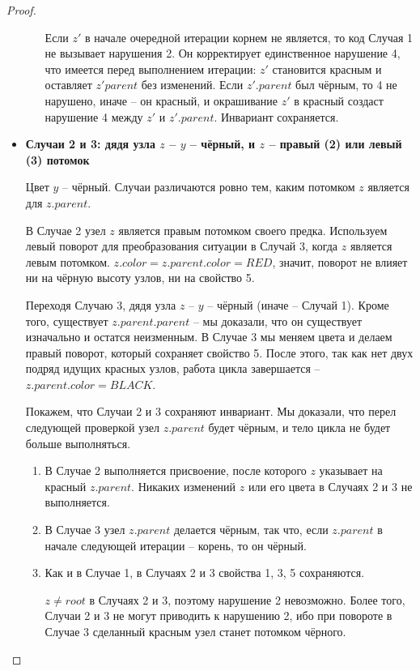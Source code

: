 \documentclass[a4paper,12pt]{article}
\begin{document}
\begin{proof}
\begin{itemize}
\begin{enumerate}
            Если $z'$ в начале очередной итерации корнем не является, то код Случая 1 не вызывает нарушения 2. Он корректирует единственное нарушение 4, что имеется перед выполнением итерации: $z'$ становится красным и оставляет $z'parent$ без изменений. Если $z'.parent$ был чёрным, то 4 не нарушено, иначе -- он красный, и окрашивание $z'$ в красный создаст нарушение 4 между $z'$ и $z'.parent$. Инвариант сохраняется.
        \end{enumerate}
        
        \item \textbf{Случаи 2 и 3: дядя узла $z$ -- $y$ -- чёрный, и $z$ -- правый (2) или левый (3) потомок}
        
        Цвет $y$ -- чёрный. Случаи различаются ровно тем, каким потомком $z$ является для $z.parent$.
        
        В Случае 2 узел $z$ является правым потомком своего предка. Используем левый поворот для преобразования ситуации в Случай 3, когда $z$ является левым потомком. $z.color = z.parent.color = RED$, значит, поворот не влияет ни на чёрную высоту узлов, ни на свойство 5. 
        
        Переходя Случаю 3, дядя узла $z$ -- $y$ -- чёрный (иначе -- Случай 1). Кроме того, существует $z.parent.parent$ -- мы доказали, что он существует изначально и остатся неизменным. В Случае 3 мы меняем цвета и делаем правый поворот, который сохраняет свойство 5. После этого, так как нет двух подряд идущих красных узлов, работа цикла завершается -- $z.parent.color = BLACK$.
        
        Покажем, что Случаи 2 и 3 сохраняют инвариант. Мы доказали, что перел следующей проверкой узел $z.parent$ будет чёрным, и тело цикла не будет больше выполняться.
        \begin{enumerate}
            \item В Случае 2 выполняется присвоение, после которого $z$ указывает на красный $z.parent$. Никаких изменений $z$ или его цвета в Случаях 2 и 3 не выполняется.
            
            \item В Случае 3 узел $z.parent$ делается чёрным, так что, если $z.parent$ в начале следующей итерации -- корень, то он чёрный.
            
            \item Как и в Случае 1, в Случаях 2 и 3 свойства 1, 3, 5 сохраняются.
            
            $z \neq root$ в Случаях 2 и 3, поэтому нарушение 2 невозможно. Более того, Случаи 2 и 3 не могут приводить к нарушению 2, ибо при повороте в Случае 3 сделанный красным узел станет потомком чёрного.
            

\end{enumerate}
\end{itemize}
\end{proof}
\end{document}
